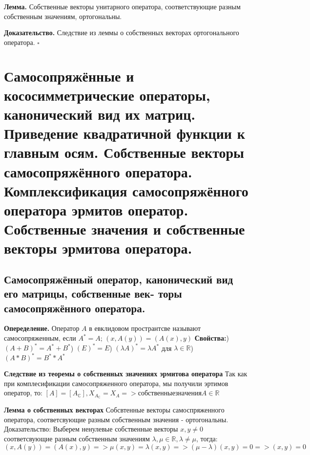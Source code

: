 \documentclass[12pt]{article}
\begin{document}
\textbf{Лемма.} Собственные векторы унитарного оператора, соответствующие
 разным собственным значениям, ортогональны.

 \textbf{Доказательство.}
 Следствие из леммы о собственных векторах ортогонального оператора. $\square$
 
 \section{Самосопряжённые и кососимметрические операторы, канонический вид их матриц. Приведение квадратичной функции к главным осям. Собственные векторы самосопряжённого оператора. Комплексификация самосопряжённого оператора эрмитов оператор. Собственные значения и собственные векторы эрмитова оператора.}

 \subsection*{Самосопряжённый оператор, канонический вид его матрицы, собственные век-
торы самосопряжённого оператора. } \newline

\textbf{Опеределение.} Оператор $A$ в евклидовом пространтсве называют самосопряженным, если $A^* = A$; $(x, A(y)) = (A(x), y)$\newline
\textbf{Свойства:}) $(A+B)^* = A^*+B^*$) $(E)^* = E$) $(\lambda A)^* =\lambda  A^*$ для $\lambda \in \mathbb{R}$) $(A*B)^* = B^**A^*$\[\]

\textbf{Следствие из теоремы о собственных значениях эрмитова оператора}
Так как при комплесификации самосопряженного оператора, мы получили эртимов оператор, то:\newline
$[A] = [A_\mathbb{C}], X_{A_\mathbb{C}} = X_A => собственные значения A \in \mathbb{R}$\[\]

\textbf{Лемма о собственных векторах}\newline
Собсвтенные векторы самоспряженного оператора, соответсвующие разным собственным значения - ортогональны. \newline
Доказательство: \newline
Выберем ненулевые собственные векторы $x, y \ne 0$ соответсвующие разным собственным значениям $\lambda, \mu \in \mathbb{R}, \lambda \ne \mu$, тогда: \newline
$(x, A(y)) = (A(x), y) => \mu(x,y) = \lambda(x,y) => (\mu - \lambda)(x,y)=0 => (x,y) = 0$\[\]
\end{document}
